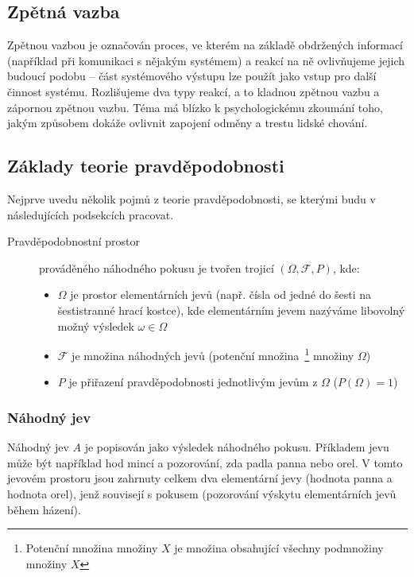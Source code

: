 \documentclass[thesis=M,czech]{FITthesis}[2014/05/07]
\begin{document}
\subsection{Zpětná vazba}
Zpětnou vazbou je označován proces, ve kterém na základě obdržených informací (například při komunikaci s nějakým systémem) a reakcí na ně ovlivňujeme jejich budoucí podobu – část systémového výstupu lze použít jako vstup pro další činnost systému. Rozlišujeme dva typy reakcí, a to kladnou zpětnou vazbu a zápornou zpětnou vazbu. Téma má blízko k psychologickému zkoumání toho, jakým způsobem dokáže ovlivnit zapojení odměny a trestu lidské chování.

\subsection{Základy teorie pravděpodobnosti}

Nejprve uvedu několik pojmů z teorie pravděpodobnosti, se kterými budu v následujících podsekcích pracovat.

\begin{description}
	\item[Pravděpodobnostní prostor] prováděného náhodného pokusu je tvořen trojicí $(\Omega,\mathcal{F},P)$, kde:
	\begin{itemize}
		\item $\Omega$ je prostor elementárních jevů (např. čísla od jedné do šesti na šestistranné hrací kostce), kde elementárním jevem nazýváme libovolný možný výsledek $\omega \in \Omega$ 
		\item $\mathcal{F}$ je množina náhodných jevů (potenční množina~\footnote{Potenční množina množiny $X$ je množina obsahující všechny podmnožiny množiny $X$} množiny $\Omega$)
		\item $P$ je přiřazení pravděpodobnosti jednotlivým jevům z $\Omega$ ($P(\Omega)=1$)
	\end{itemize}
\end{description}

\subsubsection{Náhodný jev}
Náhodný jev $A$ je popisován jako výsledek náhodného pokusu. Příkladem jevu může být například hod mincí a pozorování, zda padla panna nebo orel. V tomto jevovém prostoru jsou zahrnuty celkem dva elementární jevy (hodnota panna a hodnota orel), jenž souvisejí s pokusem (pozorování výskytu elementárních jevů během házení).
\end{document}

